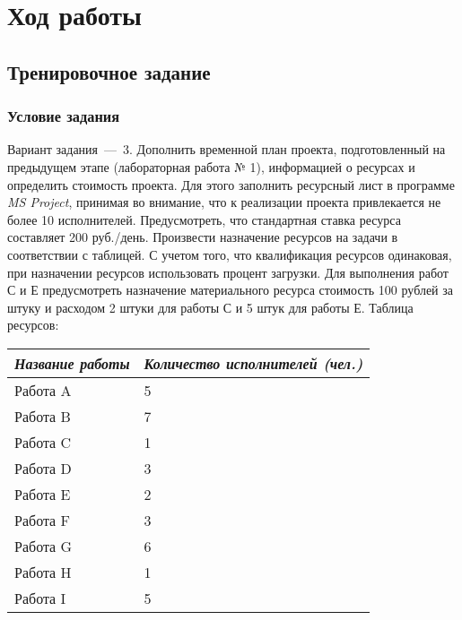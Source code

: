 \chapter{Ход работы}

\section{Тренировочное задание}

\subsection{Условие задания}

Вариант задания~---~3.
Дополнить временной план проекта, подготовленный на предыдущем этапе (лабораторная работа № 1), информацией о ресурсах и определить стоимость проекта.
Для этого заполнить ресурсный лист в программе \textit{MS Project}, принимая во внимание, что к реализации проекта привлекается не более 10 исполнителей.
Предусмотреть, что стандартная ставка ресурса составляет 200 руб./день.
Произвести назначение ресурсов на задачи в соответствии с таблицей.
С учетом того, что квалификация ресурсов одинаковая, при назначении ресурсов использовать процент загрузки.
Для выполнения работ С и Е предусмотреть назначение материального ресурса стоимость 100 рублей за штуку и расходом 2 штуки для работы С и 5 штук для работы Е.
Таблица ресурсов:
\begin{table}[h]
	\centering
	\begin{tabularx}{\textwidth}{|X|X|}
		\hline
		\textit{Название работы} & \textit{Количество исполнителей (чел.)} \\ \hline
		Работа A        & 5                 \\ \hline
		Работа B        & 7                  \\ \hline
		Работа C        & 1                 \\ \hline
		Работа D        & 3                  \\ \hline
		Работа E        & 2                  \\ \hline
		Работа F        & 3                  \\ \hline
		Работа G        & 6                 \\ \hline
		Работа H        & 1                 \\ \hline
		Работа I        & 5                  \\ \hline
	\end{tabularx}
\end{table}

